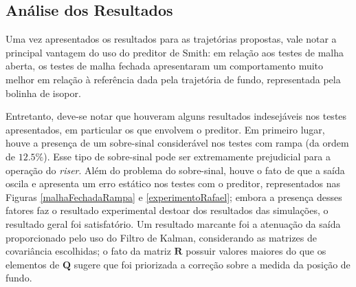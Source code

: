 \subsection{Análise dos Resultados}
Uma vez apresentados os resultados para as trajetórias propostas, vale notar a principal vantagem do uso do preditor de Smith: em relação aos testes de malha aberta, os testes de malha fechada apresentaram um comportamento muito melhor em relação à referência dada pela trajetória de fundo, representada pela bolinha de isopor.

Entretanto, deve-se notar que houveram alguns resultados indesejáveis nos testes apresentados, em particular os que envolvem o preditor. Em primeiro lugar, houve a presença de um sobre-sinal considerável nos testes com rampa (da ordem de $12.5\%$). Esse tipo de sobre-sinal pode ser extremamente prejudicial para a operação do \textit{riser}. Além do problema do sobre-sinal, houve o fato de que a saída oscila e apresenta um erro estático nos testes com o preditor, representados nas Figuras \ref{malhaFechadaRampa} e \ref{experimentoRafael}; embora a presença desses fatores faz o resultado experimental destoar dos resultados das simulações, o resultado geral foi satisfatório. Um resultado marcante foi a atenuação da saída proporcionado pelo uso do Filtro de Kalman, considerando as matrizes de covariância escolhidas; o fato da matriz $\mathbf{R}$ possuir valores maiores do que os elementos de $\mathbf{Q}$ sugere que foi priorizada a correção sobre a medida da posição de fundo.